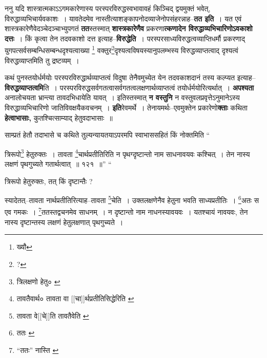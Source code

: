 \documentclass[article,12pt,a4paper]{memoir}
\begin{document}
	  \pstart ननु यदि शास्त्रात्मकाऽऽगमकारेणास्य परस्परविरुद्धस्वभावावहं किञ्चिद् द्वयमुक्तं भवेत्, विरुद्धाव्यभिचार्यवकाशः । यावतेदमेव नास्तीत्याशङ्कापनोदव्याजेनोपसंहरन्नाह--\textbf{तत इति} । \leavevmode{} यत एवं शास्त्रकारेणैवेदञ्चेदञ्चाभ्युपगतं \textbf{तत}स्तस्मात् \textbf{शास्त्रकारेणैव} प्रकरणा\textbf{त्कणादेन विरुद्धाव्यभिचारिणोऽवकाशो दत्तः} । किं कृत्वा तेन तदवकाशो दत्त इत्याह--\textbf{विरुद्धेति} । परस्परसाध्यविरुद्धत्वव्याप्तिधर्मौ प्रकरणाद् युगपत्सर्वसम्बन्धिसम्बन्धदृश्यत्वाख्या \footnote{ख्यौ} वक्तुर\footnote{?}\-दृश्यत्वविषयस्यानुपलम्भस्य विरुद्धव्याप्तत्वाद् दृश्यत्वं विरुद्धव्याप्तमिति तु द्रष्टव्यम् ।
	\pend
      

	  \pstart कथं पुनस्तयोर्धर्मयोः परस्परविरुद्धार्थव्याप्तत्वं विदुषा तेनैवमुच्येत येन तदवकाशदानं तस्य कल्प्यत इत्याह--\textbf{विरुद्धव्याप्तत्वमि}ति । परस्परविरुद्धसर्वगतत्वासर्वगतत्वलक्षणार्थव्याप्तत्वं तयोर्धर्मयोरित्यर्थात् । \textbf{अपश्यता} अनालोचयता भ्रान्त्या तावदभिधायेति यावत् । इतिस्तस्मात् \textbf{न वस्तुनि} न वस्तुवलप्रवृत्तेऽनुमानेऽस्य विरुद्धाव्यभिचारिणो जातिविवक्षयैकवचनम् । \textbf{इति}रेवमर्थे । तेनायमर्थः--एवमुक्तेन प्रकारेणो\textbf{क्ताः} कथिता \textbf{हेत्वाभासाः,} कुतश्चित्साम्याद् हेतुवदाभासाः ॥
	\pend
      

	  \pstart साम्प्रतं हेतौ तदाभासे च कथिते तुल्यन्यायतयाऽपरमपि स्वाभाससहितं किं नोक्तमिति  \leavevmode{} “
	  
	त्रिरूपो\footnote{त्रिलक्षणो हेतु० \cite{dp-msC}} हेतुरुक्तः । तावता \footnote{तावतैवार्थ० \cite{dp-msB} \cite{dp-msD} \cite{dp-edP} \cite{dp-edH} \cite{dp-edE} \cite{dp-edN} तावता वा [[चा]]र्थप्रतीतिसिद्धेरिति \cite{dp-msC}}\-चार्थप्रतीतिरिति न पृथग्दृष्टान्तो नाम साधनावयवः कश्चित् । तेन नास्य लक्षणं पृथगुच्यते गतार्थत्वात् ॥ १२१ ॥” “
	  
	त्रिरूपो हेतुरुक्तः, तत् किं दृष्टान्तैः ? 
	  
	स्यादेतत्--तावता नार्थप्रतीतिरित्याह--तावता \footnote{तावता वे[[चे]]ति \cite{dp-msC} तावतैवेति \cite{dp-msB} \cite{dp-msD} \cite{dp-edP} \cite{dp-edH} \cite{dp-edE} \cite{dp-edN}}\-चेति । उक्तलक्षणेनैव हेतुना भवति साध्यप्रतीतिः । \footnote{ततः \cite{dp-msB}}\-अतः स एव गमकः । \footnote{“ततः” नास्ति \cite{dp-msA} \cite{dp-edP} \cite{dp-edH}}\-ततस्तद्वचनमेव साधनम् । न दृष्टान्तो नाम नाधनस्यावयवः । यतश्चायं नावयवः, तेन नास्य दृष्टान्तस्य लक्षणं हेतुलक्षणात् पृथगुच्यते । 
	  
\end{document}
